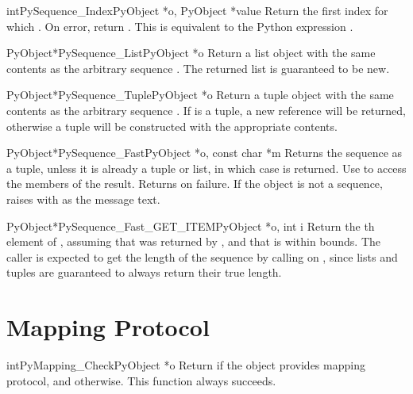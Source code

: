 \documentclass{manual}
\begin{document}
\begin{cfuncdesc}{int}{PySequence_Index}{PyObject *o, PyObject *value}
Return the first index  for which .  On error, return .    This is equivalent to
the Python expression .
\end{cfuncdesc}

\begin{cfuncdesc}{PyObject*}{PySequence_List}{PyObject *o}
Return a list object with the same contents as the arbitrary sequence
.  The returned list is guaranteed to be new.
\end{cfuncdesc}

\begin{cfuncdesc}{PyObject*}{PySequence_Tuple}{PyObject *o}
Return a tuple object with the same contents as the arbitrary sequence
.  If  is a tuple, a new reference will be returned,
otherwise a tuple will be constructed with the appropriate contents.
\end{cfuncdesc}


\begin{cfuncdesc}{PyObject*}{PySequence_Fast}{PyObject *o, const char *m}
Returns the sequence  as a tuple, unless it is already a
tuple or list, in which case  is returned.  Use
 to access the members of the
result.  Returns \NULL{} on failure.  If the object is not a sequence,
raises  with  as the message text.
\end{cfuncdesc}

\begin{cfuncdesc}{PyObject*}{PySequence_Fast_GET_ITEM}{PyObject *o, int i}
Return the th element of , assuming that  was
returned by , and that  is within
bounds.  The caller is expected to get the length of the sequence by
calling  on , since lists and tuples
are guaranteed to always return their true length.
\end{cfuncdesc}


\section{Mapping Protocol \label{mapping}}

\begin{cfuncdesc}{int}{PyMapping_Check}{PyObject *o}
Return  if the object provides mapping protocol, and
 otherwise.  This function always succeeds.
\end{cfuncdesc}
\end{document}
